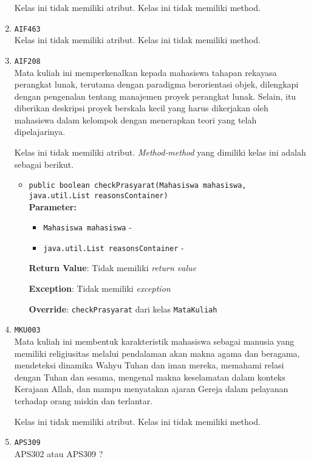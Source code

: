 \documentclass{article}
\begin{document}
\begin{enumerate}
Kelas ini tidak memiliki atribut. Kelas ini tidak memiliki method. \item \texttt{AIF463}\\ 


Kelas ini tidak memiliki atribut. Kelas ini tidak memiliki method. \item \texttt{AIF208}\\ 
Mata kuliah ini memperkenalkan kepada mahasiswa tahapan rekayasa perangkat 
 lunak, terutama dengan paradigma berorientasi objek, dilengkapi dengan 
 pengenalan tentang manajemen proyek perangkat lunak.
 Selain, itu diberikan deskripsi proyek berskala kecil yang harus dikerjakan 
 oleh mahasiswa dalam kelompok dengan menerapkan teori yang telah 
 dipelajarinya.

Kelas ini tidak memiliki atribut. \textit{Method-method} yang dimiliki kelas ini adalah sebagai berikut.
\begin{itemize}
\item \texttt{public boolean checkPrasyarat(Mahasiswa mahasiswa, java.util.List reasonsContainer)}\\ 


\textbf{Parameter:}\begin{itemize}
\item \texttt{Mahasiswa mahasiswa} - 
\item \texttt{java.util.List reasonsContainer} - 
\end{itemize}
\textbf{Return Value}: Tidak memiliki \textit{return value}

\textbf{Exception}: Tidak memiliki \textit{exception}

\textbf{Override}: \texttt{checkPrasyarat} dari kelas \texttt{MataKuliah}

\end{itemize}
\item \texttt{MKU003}\\ 
Mata kuliah ini membentuk karakteristik mahasiswa sebagai manusia yang memiliki religiusitas
 melalui pendalaman akan makna agama dan beragama, mendeteksi dinamika Wahyu Tuhan dan iman 
 mereka, memahami relasi dengan Tuhan dan sesama, mengenal makna keselamatan dalam konteks 
 Kerajaan Allah, dan mampu menyatakan ajaran Gereja dalam pelayanan terhadap orang miskin dan
 terlantar.

Kelas ini tidak memiliki atribut. Kelas ini tidak memiliki method. \item \texttt{APS309}\\ 
APS302 atau APS309 ?


\end{enumerate}
\end{document}
